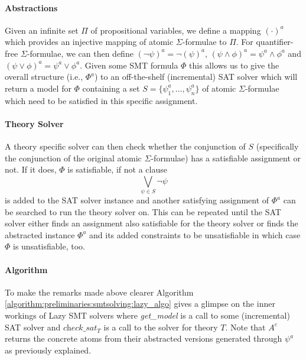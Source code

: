 \paragraph{Abstractions}
Given an infinite set $\Pi$ of propositional variables, we define a mapping $(\cdot)^a$ which provides an injective mapping of atomic $\Sigma$-formulae to $\Pi$. For quantifier-free $\Sigma$-formulae, we can then define $\left(\neg\psi\right)^a=\neg\left(\psi\right)^a$, $\left(\psi\land\phi\right)^a=\psi^a\land\phi^a$ and $\left(\psi\lor\phi\right)^a=\psi^a\lor\phi^a$. Given some SMT formula $\Phi$ this allows us to give the overall structure (i.e., $\Phi^a$) to an off-the-shelf (incremental) SAT solver which will return a model for $\Phi$ containing a set $S=\{\psi_1^a,\dots,\psi_n^a\}$ of atomic $\Sigma$-formulae which need to be satisfied in this specific assignment.

\paragraph{Theory Solver}
A theory specific solver can then check whether the conjunction of $S$ (specifically the conjunction of the original atomic $\Sigma$-formulae) has a satisfiable assignment or not. If it does, $\Phi$ is satisfiable, if not a clause \[\bigvee\limits_{\psi\in S} \neg\psi\] is added to the SAT solver instance and another satisfying assignment of $\Phi^a$ can be searched to run the theory solver on. This can be repeated until the SAT solver either finds an assignment also satisfiable for the theory solver or finds the abstracted instance $\Phi^a$ and its added constraints to be unsatisfiable in which case $\Phi$ is unsatisfiable, too.

\paragraph{Algorithm}
To make the remarks made above clearer Algorithm \ref{algorithm:preliminaries:smtsolving:lazy_algo} gives a glimpse on the inner workings of Lazy SMT solvers where \textit{get\_model} is a call to some (incremental) SAT solver and $\textit{check\_sat}_T$ is a call to the solver for theory $T$.
Note that $A^c$ returns the concrete atoms from their abstracted versions generated through $\psi^a$ as previously explained.

